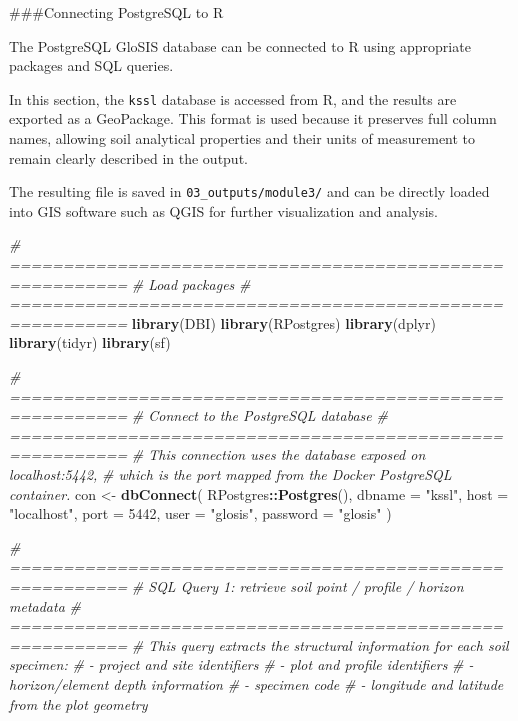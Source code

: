 \documentclass[
  10pt,
  b5paper,
  oneside]{book}
\newenvironment{Shaded}{\begin{snugshade}}{\end{snugshade}}
\newcommand{\AttributeTok}[1]{\textcolor[rgb]{0.13,0.29,0.53}{#1}}
\newcommand{\CommentTok}[1]{\textcolor[rgb]{0.56,0.35,0.01}{\textit{#1}}}
\newcommand{\DecValTok}[1]{\textcolor[rgb]{0.00,0.00,0.81}{#1}}
\newcommand{\FunctionTok}[1]{\textcolor[rgb]{0.13,0.29,0.53}{\textbf{#1}}}
\newcommand{\NormalTok}[1]{#1}
\newcommand{\OtherTok}[1]{\textcolor[rgb]{0.56,0.35,0.01}{#1}}
\newcommand{\SpecialCharTok}[1]{\textcolor[rgb]{0.81,0.36,0.00}{\textbf{#1}}}
\newcommand{\StringTok}[1]{\textcolor[rgb]{0.31,0.60,0.02}{#1}}
\begin{document}
\#\#\#Connecting PostgreSQL to R

The PostgreSQL GloSIS database can be connected to R using appropriate packages and SQL queries.

In this section, the \texttt{kssl} database is accessed from R, and the results are exported as a GeoPackage. This format is used because it preserves full column names, allowing soil analytical properties and their units of measurement to remain clearly described in the output.

The resulting file is saved in \texttt{03\_outputs/module3/} and can be directly loaded into GIS software such as QGIS for further visualization and analysis.

\begin{Shaded}
\begin{Highlighting}[]
\CommentTok{\# =========================================================}
\CommentTok{\# Load packages}
\CommentTok{\# =========================================================}
\FunctionTok{library}\NormalTok{(DBI)}
\FunctionTok{library}\NormalTok{(RPostgres)}
\FunctionTok{library}\NormalTok{(dplyr)}
\FunctionTok{library}\NormalTok{(tidyr)}
\FunctionTok{library}\NormalTok{(sf)}

\CommentTok{\# =========================================================}
\CommentTok{\# Connect to the PostgreSQL database}
\CommentTok{\# =========================================================}
\CommentTok{\# This connection uses the database exposed on localhost:5442,}
\CommentTok{\# which is the port mapped from the Docker PostgreSQL container.}
\NormalTok{con }\OtherTok{\textless{}{-}} \FunctionTok{dbConnect}\NormalTok{(}
\NormalTok{  RPostgres}\SpecialCharTok{::}\FunctionTok{Postgres}\NormalTok{(),}
  \AttributeTok{dbname   =} \StringTok{"kssl"}\NormalTok{,}
  \AttributeTok{host     =} \StringTok{"localhost"}\NormalTok{,}
  \AttributeTok{port     =} \DecValTok{5442}\NormalTok{,}
  \AttributeTok{user     =} \StringTok{"glosis"}\NormalTok{,}
  \AttributeTok{password =} \StringTok{"glosis"}
\NormalTok{)}

\CommentTok{\# =========================================================}
\CommentTok{\# SQL Query 1: retrieve soil point / profile / horizon metadata}
\CommentTok{\# =========================================================}
\CommentTok{\# This query extracts the structural information for each soil specimen:}
\CommentTok{\# {-} project and site identifiers}
\CommentTok{\# {-} plot and profile identifiers}
\CommentTok{\# {-} horizon/element depth information}
\CommentTok{\# {-} specimen code}
\CommentTok{\# {-} longitude and latitude from the plot geometry}


\end{Highlighting}
\end{Shaded}
\end{document}
